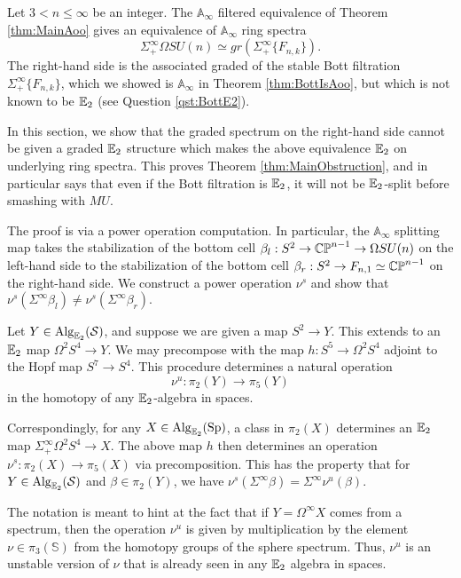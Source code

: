 

Let $3< n\leq \infty$ be an integer.  The $\mathbb{A}_{\infty}$ filtered equivalence of Theorem \ref{thm:MainAoo} gives an equivalence of $\mathbb{A}_\infty$ ring spectra  $$\Sigma^{\infty}_+ \Omega SU(n) \simeq gr(\Sigma^{\infty}_+ \{ F_{n,k} \}).$$  The right-hand side is the associated graded of the stable Bott filtration $\Sigma^{\infty}_+ \{ F_{n,k} \}$, which we showed is $\mathbb{A}_\infty$ in Theorem \ref{thm:BottIsAoo}, but which is not known to be $\operatorname{\mathbb{E}}_2$ (see Question \ref{qst:BottE2}).

In this section, we show that the graded spectrum on the right-hand side cannot be given a graded $\operatorname{\mathbb{E}}_2$ structure which makes the above equivalence $\operatorname{\mathbb{E}}_2$ on underlying ring spectra.  This proves Theorem \ref{thm:MainObstruction}, and in particular says that even if the Bott filtration is $\operatorname{\mathbb{E}}_2$, it will not be $\operatorname{\mathbb{E}}_2$-split before smashing with $MU$. 

The proof is via a power operation computation.  In particular, the $\mathbb{A}_\infty$ splitting map takes the stabilization of the bottom cell $\beta_l : S^2 \to  \operatorname{\mathbb{CP}}^{n-1} \to \Omega SU(n)$ on the left-hand side to the stabilization of the bottom cell $\beta_r: S^2 \to F_{n,1} \simeq \operatorname{\mathbb{CP}}^{n-1}$ on the right-hand side.  We construct a power operation $\nu^{s}$ and show that $\nu^{s}(\Sigma^{\infty} \beta_l) \neq \nu^s(\Sigma^{\infty} \beta_r).$ 

\begin{obs}Let $Y\in \operatorname{\mathrm{Alg}}_{\operatorname{\mathbb{E}}_2}(\operatorname{\mathcal{S}})$, and suppose we are given a map $S^2\to Y$.  This extends to an $\operatorname{\mathbb{E}}_2$ map $\Omega^2 S^4 \to Y.$  We may precompose with the map $h: S^5 \to \Omega^2 S^4$ adjoint to the Hopf map $S^7\to S^4$.  This procedure determines a natural operation $$\nu^u: \pi_2(Y) \to \pi_5(Y)$$ in the homotopy of any $\operatorname{\mathbb{E}}_2$-algebra in spaces.  

Correspondingly, for any $X\in \operatorname{\mathrm{Alg}}_{\operatorname{\mathbb{E}}_2}(\operatorname{\mathrm{Sp}})$, a class in $\pi_2(X)$ determines an $\operatorname{\mathbb{E}}_2$ map $\Sigma^{\infty}_+ \Omega^2 S^4 \to X$.  The above map $h$ then determines an operation $\nu^s :\pi_2(X) \to \pi_5(X)$ via precomposition.  This has the property that for $Y\in \operatorname{\mathrm{Alg}}_{\operatorname{\mathbb{E}}_2}(\operatorname{\mathcal{S}})$ and $\beta \in \pi_2(Y)$, we have $\nu^s(\Sigma^{\infty} \beta) = \Sigma^{\infty} \nu^u (\beta).$
\end{obs}

\begin{rmk} \label{rmk:multnu}
The notation is meant to hint at the fact that if $Y = \Omega^\infty X$ comes from a spectrum, then the operation $\nu^u$ is given by multiplication by the element $\nu \in \pi_3(\mathbb{S})$ from the homotopy groups of the sphere spectrum.  Thus, $\nu^u$ is an unstable version of $\nu$ that is already seen in any $\operatorname{\mathbb{E}}_2$ algebra in spaces.    %
\end{rmk}

